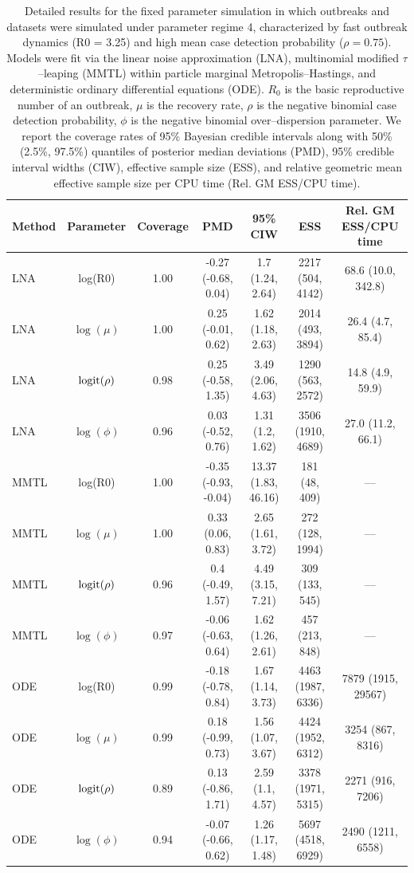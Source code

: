 \begin{table}
	\begin{fullpage}
		\small
		\centering
		\begin{tabular}{lcccccc}
			\hline
			\textbf{Method} & \textbf{Parameter} & \textbf{Coverage} & \textbf{PMD} & \textbf{95\% CIW} & \textbf{ESS} & \textbf{Rel. GM ESS/CPU time} \\ 
			\hline
			LNA & log(R0) & 1.00 & -0.27 (-0.68, 0.04) & 1.7 (1.24, 2.64) & 2217 (504, 4142) & 68.6 (10.0, 342.8) \\ 
			LNA & $\log(\mu)$ & 1.00 & 0.25 (-0.01, 0.62) & 1.62 (1.18, 2.63) & 2014 (493, 3894) & 26.4 (4.7, 85.4) \\ 
			LNA & $\mathrm{logit}(\rho)$ & 0.98 & 0.25 (-0.58, 1.35) & 3.49 (2.06, 4.63) & 1290 (563, 2572) & 14.8 (4.9, 59.9) \\ 
			LNA & $\log(\phi)$ & 0.96 & 0.03 (-0.52, 0.76) & 1.31 (1.2, 1.62) & 3506 (1910, 4689) & 27.0 (11.2, 66.1) \\ 
			MMTL & log(R0) & 1.00 & -0.35 (-0.93, -0.04) & 13.37 (1.83, 46.16) & 181 (48, 409) & --- \\ 
			MMTL & $\log(\mu)$ & 1.00 & 0.33 (0.06, 0.83) & 2.65 (1.61, 3.72) & 272 (128, 1994) & --- \\ 
			MMTL & $\mathrm{logit}(\rho)$ & 0.96 & 0.4 (-0.49, 1.57) & 4.49 (3.15, 7.21) & 309 (133, 545) & --- \\ 
			MMTL & $\log(\phi)$ & 0.97 & -0.06 (-0.63, 0.64) & 1.62 (1.26, 2.61) & 457 (213, 848) & --- \\ 
			ODE & log(R0) & 0.99 & -0.18 (-0.78, 0.84) & 1.67 (1.14, 3.73) & 4463 (1987, 6336) & 7879 (1915, 29567) \\ 
			ODE & $\log(\mu)$ & 0.99 & 0.18 (-0.99, 0.73) & 1.56 (1.07, 3.67) & 4424 (1952, 6312) & 3254 (867, 8316) \\ 
			ODE & $\mathrm{logit}(\rho)$ & 0.89 & 0.13 (-0.86, 1.71) & 2.59 (1.1, 4.57) & 3378 (1971, 5315) & 2271 (916, 7206) \\ 
			ODE & $\log(\phi)$ & 0.94 & -0.07 (-0.66, 0.62) & 1.26 (1.17, 1.48) & 5697 (4518, 6929) & 2490 (1211, 6558) \\ 
			\hline
		\end{tabular}
		\caption[Fast dynamics, high detection probability regime fixed parameter coverage simulation results.]{Detailed results for the fixed parameter simulation in which outbreaks and datasets were simulated under parameter regime 4, characterized by fast outbreak dynamics (R0 = 3.25) and high mean case detection probability ($ \rho = 0.75 $). Models were fit via the linear noise approximation (LNA), multinomial modified $ \tau $--leaping (MMTL) within particle marginal Metropolis--Hastings, and deterministic ordinary differential equations (ODE). $ R_0 $ is the basic reproductive number of an outbreak, $ \mu $ is the recovery rate, $ \rho $ is the negative binomial case detection probability, $ \phi $ is the negative binomial over--dispersion parameter. We report the coverage rates of 95\% Bayesian credible intervals along with 50\% (2.5\%, 97.5\%) quantiles of posterior median deviations (PMD), 95\% credible interval widths (CIW), effective sample size (ESS), and relative geometric mean effective sample size per CPU time (Rel. GM ESS/CPU time).}

\end{fullpage}
\end{table}
